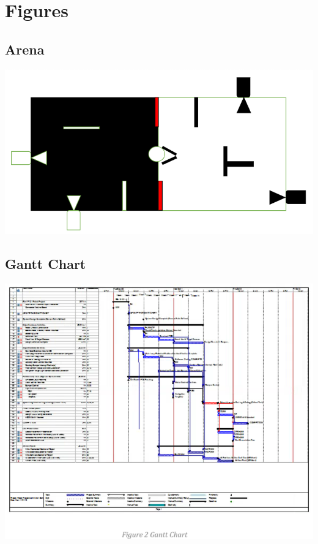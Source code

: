 \documentclass{article}
\begin{document}
\section{Figures}
\subsection{Arena}
\includegraphics[width=\textwidth]{Arena.png}
\subsection{Gantt Chart}
\includegraphics[width=\textwidth]{Gantt_Chart.png}
\end{document}
